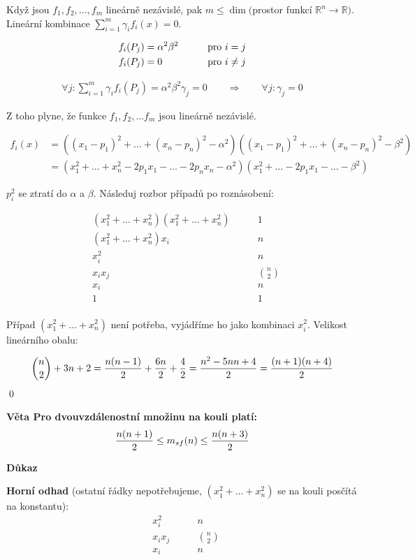 \documentclass[a4paper,12pt,titlepage]{article}
\newcommand{\dk}{\smallskip\noindent\bf Důkaz\rm{} }
\newcommand{\vt}{\smallskip\noindent\bf Věta\rm{} }
\newcommand{\R}{\mathbb{R}}
\begin{document}
Když jsou $f_1, f_2, \dots, f_m$ lineárně nezávislé, pak $m \leq \dim($prostor funkcí $\R^n \rightarrow \R)$. Lineární kombinace $\sum_{i=1}^m \gamma_if_i(x) = 0$.

\begin{align}
f_i(P_j) &= \alpha^2\beta^2&\qquad {\rm pro}\ i=j\\
f_i(P_j) &= 0&\qquad {\rm pro}\ i\neq j
\end{align}

\begin{align}
\forall j: \sum_{i=1}^m \gamma_if_i(P_j) = \alpha^2\beta^2\gamma_j = 0 \qquad\Rightarrow\qquad \forall j: \gamma_j = 0
\end{align}

Z toho plyne, že funkce $f_1, f_2, \dots f_m$ jsou lineárně nezávislé.

\begin{align}
f_i(x) &= ((x_1-p_1)^2+\dots+(x_n-p_n)^2-\alpha^2) ((x_1-p_1)^2+\dots+(x_n-p_n)^2-\beta^2) \\
&= (x_1^2+\dots+x_n^2-2p_1x_1-\dots-2p_nx_n-\alpha^2) (x_1^2+\dots-2p_1x_1-\dots-\beta^2)
\end{align}

$p_i^2$ se ztratí do $\alpha$ a $\beta$. Následuj rozbor případů po roznásobení:

\begin{align}
	&(x_1^2+\dots+x_n^2)(x_1^2+\dots+x_n^2) &\qquad 1\\
	&(x_1^2+\dots+x_n^2)x_i &\qquad n\\
	&x_i^2 &\qquad n\\
	&x_ix_j &\qquad {n \choose 2}\\
	&x_i &\qquad n\\
	&1 &\qquad 1\\
\end{align}

Případ $(x_1^2+\dots+x_n^2)$ není potřeba, vyjádříme ho jako kombinaci $x_i^2$. Velikost lineárního obalu:

$${n\choose 2} + 3n + 2 = {n(n-1) \over 2} + {6n\over 2} + {4\over 2} = {n^2-5nn+4 \over 2} = {(n+1)(n+4)\over 2}$$ \qed


\vt Pro dvouvzdálenostní množinu na kouli platí: $${n(n+1)\over 2} \leq m_{sf}(n) \leq {n(n+3)\over 2}$$

\dk

{\bf Horní odhad} (ostatní řádky nepotřebujeme, $(x_1^2 + \dots + x_n^2)$ se na kouli posčítá na konstantu):
\begin{align}
	&x_i^2 &\qquad n\\
	&x_ix_j &\qquad {n \choose 2}\\
	&x_i &\qquad n\\
\end{align}
\end{document}
